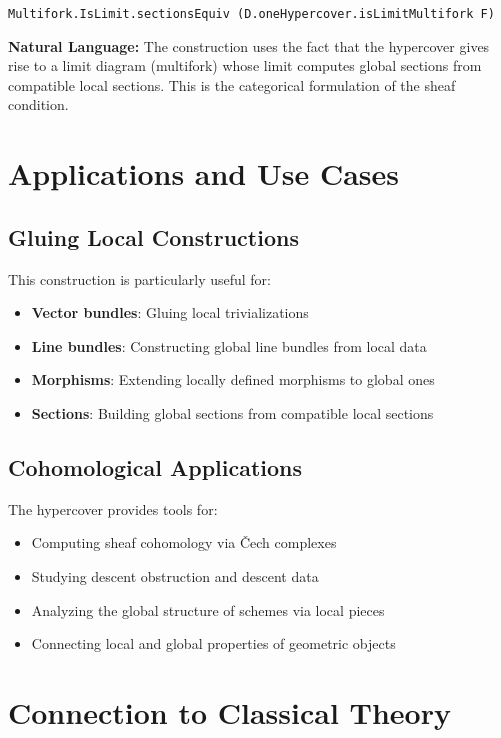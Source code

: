 \documentclass{article}
\theoremstyle{definition}
\begin{document}
\begin{lstlisting}
Multifork.IsLimit.sectionsEquiv (D.oneHypercover.isLimitMultifork F)
\end{lstlisting}

\textbf{Natural Language:} The construction uses the fact that the hypercover gives rise to a limit diagram (multifork) whose limit computes global sections from compatible local sections. This is the categorical formulation of the sheaf condition.

\section{Applications and Use Cases}

\subsection{Gluing Local Constructions}

This construction is particularly useful for:
\begin{itemize}
\item \textbf{Vector bundles}: Gluing local trivializations
\item \textbf{Line bundles}: Constructing global line bundles from local data
\item \textbf{Morphisms}: Extending locally defined morphisms to global ones
\item \textbf{Sections}: Building global sections from compatible local sections
\end{itemize}

\subsection{Cohomological Applications}

The hypercover provides tools for:
\begin{itemize}
\item Computing sheaf cohomology via Čech complexes
\item Studying descent obstruction and descent data
\item Analyzing the global structure of schemes via local pieces
\item Connecting local and global properties of geometric objects
\end{itemize}

\section{Connection to Classical Theory}
\end{document}
